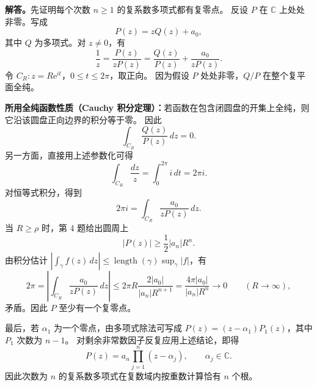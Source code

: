 \documentclass[11pt,a4paper]{ctexart}
\newcommand{\C}{\mathbb C}
\newcommand{\e}{\mathrm e}
\begin{document}
\textbf{解答。}先证明每个次数 $n\ge1$ 的复系数多项式都有复零点。
反设 $P$ 在 $\C$ 上处处非零。写成
\[
P(z)=zQ(z)+a_0,
\]
其中 $Q$ 为多项式。对 $z\ne0$，有
\[
\frac1z=\frac{P(z)}{zP(z)}
=\frac{Q(z)}{P(z)}+\frac{a_0}{zP(z)}.
\]
令 $C_R: z=R\e^{it}$，$0\le t\le2\pi$，取正向。
因为假设 $P$ 处处非零，$Q/P$ 在整个复平面全纯。

\textbf{所用全纯函数性质（Cauchy 积分定理）：}若函数在包含闭圆盘的开集上全纯，则它沿该圆盘正向边界的积分等于零。
因此
\[
\int_{C_R}\frac{Q(z)}{P(z)}\,dz=0.
\]
另一方面，直接用上述参数化可得
\[
\int_{C_R}\frac{dz}{z}=\int_0^{2\pi}i\,dt=2\pi i.
\]
对恒等式积分，得到
\[
2\pi i=\int_{C_R}\frac{a_0}{zP(z)}\,dz.
\]
当 $R\ge\rho$ 时，第 4 题给出圆周上
\[
|P(z)|\ge\frac12|a_n|R^n.
\]
由积分估计 $|\int_\gamma f(z)\,dz|\le \operatorname{length}(\gamma)\sup_\gamma|f|$，有
\[
2\pi
=\left|\int_{C_R}\frac{a_0}{zP(z)}\,dz\right|
\le 2\pi R\frac{2|a_0|}{|a_n|R^{n+1}}
=\frac{4\pi|a_0|}{|a_n|R^n}\longrightarrow0
\qquad(R\to\infty),
\]
矛盾。因此 $P$ 至少有一个复零点。

最后，若 $\alpha_1$ 为一个零点，由多项式除法可写成
$P(z)=(z-\alpha_1)P_1(z)$，其中 $P_1$ 次数为 $n-1$。
对剩余非常数因子反复应用上述结论，即得
\[
\boxed{P(z)=a_n\prod_{j=1}^n(z-\alpha_j),\qquad \alpha_j\in\C.}
\]
因此次数为 $n$ 的复系数多项式在复数域内按重数计算恰有 $n$ 个根。
\end{document}
